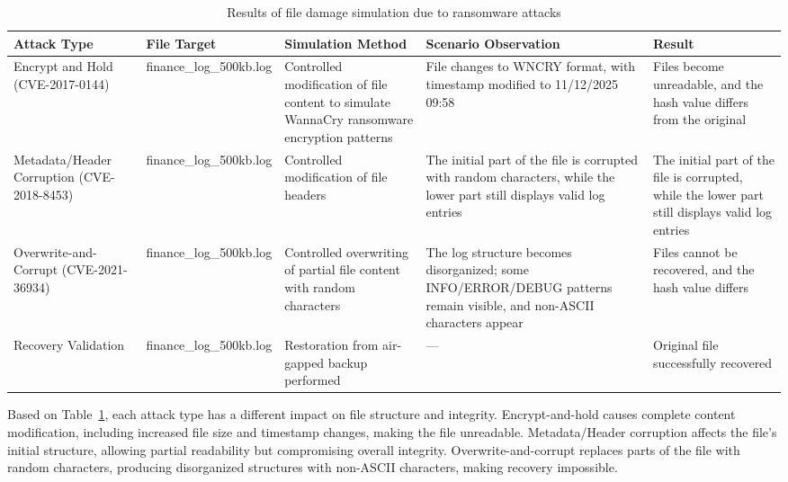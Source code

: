 \documentclass{iaesarticle}
\begin{document}
\begin{table}[H]
\centering
\fontsize{8pt}{10pt}\selectfont
\caption{Results of file damage simulation due to ransomware attacks}
\label{tab:damage_simulation}
\begin{tabularx}{\textwidth}{@{}>{\raggedright\arraybackslash}p{2.2cm} >{\raggedright\arraybackslash}p{1.9cm} >{\raggedright\arraybackslash}X >{\raggedright\arraybackslash}X >{\raggedright\arraybackslash}X@{}}
\hline
\textbf{Attack Type} & \textbf{File Target} & \textbf{Simulation Method} & \textbf{Scenario Observation} & \textbf{Result} \\
\hline
Encrypt and Hold (CVE-2017-0144) & finance\_\-log\_\-500kb.log & Controlled modification of file content to simulate WannaCry ransomware encryption patterns & File changes to WNCRY format, with timestamp modified to 11/12/2025 09:58 & Files become unreadable, and the hash value differs from the original \\
Metadata/Header Corruption (CVE-2018-8453) & finance\_\-log\_\-500kb.log & Controlled modification of file headers & The initial part of the file is corrupted with random characters, while the lower part still displays valid log entries & The initial part of the file is corrupted, while the lower part still displays valid log entries \\
Overwrite-and-Corrupt (CVE-2021-36934) & finance\_\-log\_\-500kb.log & Controlled overwriting of partial file content with random characters & The log structure becomes disorganized; some INFO/ERROR/DEBUG patterns remain visible, and non-ASCII characters appear & Files cannot be recovered, and the hash value differs \\
Recovery Validation & finance\_\-log\_\-500kb.log & Restoration from air-gapped backup performed & --- & Original file successfully recovered \\
\hline
\end{tabularx}
\end{table}

Based on Table~\ref{tab:damage_simulation}, each attack type has a different impact on file structure and integrity. Encrypt-and-hold causes complete content modification, including increased file size and timestamp changes, making the file unreadable. Metadata/Header corruption affects the file's initial structure, allowing partial readability but compromising overall integrity. Overwrite-and-corrupt replaces parts of the file with random characters, producing disorganized structures with non-ASCII characters, making recovery impossible.
\end{document}
